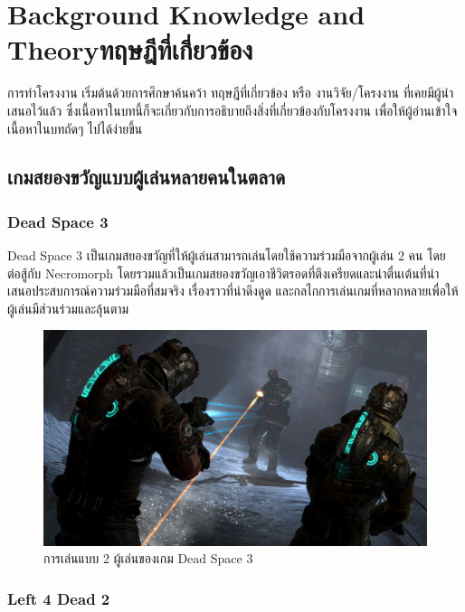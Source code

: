 \chapter{\ifenglish Background Knowledge and Theory\else ทฤษฎีที่เกี่ยวข้อง\fi}

การทำโครงงาน เริ่มต้นด้วยการศึกษาค้นคว้า ทฤษฎีที่เกี่ยวข้อง หรือ งานวิจัย/โครงงาน ที่เคยมีผู้นำเสนอไว้แล้ว ซึ่งเนื้อหาในบทนี้ก็จะเกี่ยวกับการอธิบายถึงสิ่งที่เกี่ยวข้องกับโครงงาน เพื่อให้ผู้อ่านเข้าใจเนื้อหาในบทถัดๆ ไปได้ง่ายขึ้น

\section{เกมสยองขวัญแบบผู้เล่นหลายคนในตลาด}
\subsection{Dead Space 3}

Dead Space 3 เป็นเกมสยองขวัญที่ให้ผู้เล่นสามารถเล่นโดยใช้ความร่วมมือจากผู้เล่น 2 คน โดยต่อสู้กับ Necromorph โดยรวมแล้วเป็นเกมสยองขวัญเอาชีวิตรอดที่ตึงเครียดและน่าตื่นเต้นที่นำเสนอประสบการณ์ความร่วมมือที่สมจริง เรื่องราวที่น่าดึงดูด และกลไกการเล่นเกมที่หลากหลายเพื่อให้ผู้เล่นมีส่วนร่วมและลุ้นตาม \cite{DeadSpace3}

\begin{figure}[p]
  \begin{center}
  \includegraphics[width=\textwidth]{./img/deadspace3.jpg}
  \end{center}
  \caption[ภาพเกม Dead Space 3]{การเล่นแบบ 2 ผู้เล่นของเกม Dead Space 3}
  \label{fig:DeadSpace3}
\end{figure}

\subsection{Left 4 Dead 2}


